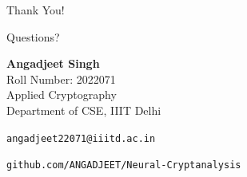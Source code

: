 \documentclass[aspectratio=169, 10pt]{beamer}
\begin{document}
\begin{frame}[plain]
  \begin{center}
    {\Huge Thank You!}

    \vspace{0.4cm}

    {\Large Questions?}

    \vspace{0.6cm}

    \textbf{Angadjeet Singh}\\[0.1cm]
    Roll Number: 2022071\\
    Applied Cryptography\\
    Department of CSE, IIIT Delhi

    \vspace{0.2cm}

    \texttt{angadjeet22071@iiitd.ac.in}

    \vspace{0.2cm}

    {\scriptsize \texttt{github.com/ANGADJEET/Neural-Cryptanalysis}}
  \end{center}
\end{frame}

\appendix
\end{document}
